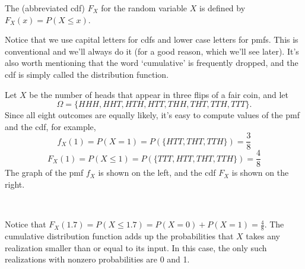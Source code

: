 \begin{definition}
The  (abbreviated cdf) $F_X$ for the random variable $X$ is defined by $F_X(x) = P(X \leq x)$.
\end{definition}

Notice that we use capital letters for cdfs and lower case letters for pmfs. This is conventional and we'll always do it (for a good reason, which we'll see later). It's also worth mentioning that the word `cumulative' is frequently dropped, and the cdf is simply called the distribution function.

\begin{example} Let $X$ be the number of heads that appear in three flips of a fair coin, and let
$$\Omega = \{HHH, HHT, HTH, HTT, THH, THT, TTH, TTT\}.$$
Since all eight outcomes are equally likely, it's easy to compute values of the pmf and the cdf, for example, 
$$f_X(1) = P(X = 1) = P (\{HTT, THT, TTH\}) = \textstyle\frac{3}{8}$$
$$F_X(1) = P(X \leq 1) = P (\{TTT, HTT, THT, TTH\}) = \textstyle\frac{4}{8}$$
The graph of the pmf $f_X$ is shown on the left, and the cdf $F_X$ is shown on the right.
\begin{center}
\ \ \ \ \ \  
\end{center}

Notice that $F_X(1.7) = P(X \leq 1.7) = P(X = 0) + P(X = 1) = \frac{4}{8}$. The cumulative distribution function adds up the probabilities that $X$ takes any realization smaller than or equal to its input. In this case, the only such realizations with nonzero probabilities are 0 and 1.
\end{example}

